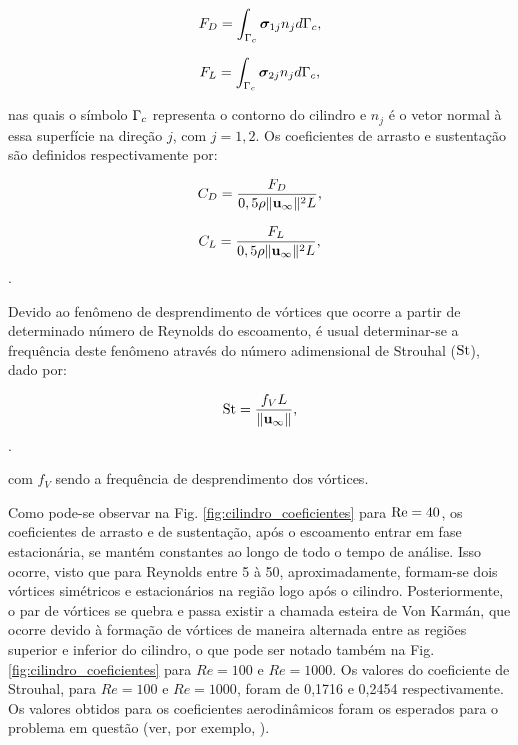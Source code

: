 \documentclass[tese_patricia]{subfiles}%
\begin{document}
\begin{align}
F_D = \int_{\Gamma_{c}} \boldsymbol{\sigma}_{1j}n_{j} d\Gamma_{c},
\end{align}

\begin{align}
F_L = \int_{\Gamma_{c}} \boldsymbol{\sigma}_{2j}n_{j} d\Gamma_{c},
\end{align}

\noindent nas quais o símbolo $\Gamma_{c}$ representa o contorno do cilindro e $n_j$ é o vetor normal à essa superfície na direção $j$, com $j=1,2$. Os coeficientes de arrasto e sustentação são definidos respectivamente por:

\begin{align}
	C_D = \frac{F_D}{0,5\rho \lVert \mathbf{u}_{\infty} \lVert^{2} L},
\end{align}

\begin{align}
	C_L = \frac{F_L}{0,5\rho \lVert \mathbf{u}_{\infty} \lVert^{2} L},
\end{align}.

Devido ao fenômeno de desprendimento de vórtices que ocorre a partir de determinado número de Reynolds do escoamento, é usual determinar-se a frequência deste fenômeno através do número adimensional de Strouhal ($\mathrm{St}$), dado por:

\begin{align}
	\mathrm{St} = \frac{f_{V}L}{\lVert \mathbf{u}_{\infty} \lVert},
\end{align}.

\noindent com $f_{V}$ sendo a frequência de desprendimento dos vórtices.

Como pode-se observar na Fig. \ref{fig:cilindro_coeficientes} para $\mathrm{Re} = 40$, os coeficientes de arrasto e de sustentação, após o escoamento entrar em fase estacionária, se mantém constantes ao longo de todo o tempo de análise. Isso ocorre, visto que para Reynolds entre 5 à 50, aproximadamente, formam-se dois vórtices simétricos e estacionários na região logo após o cilindro. Posteriormente, o par de vórtices se quebra e passa existir a chamada esteira de Von Karmán, que ocorre devido à formação de vórtices de maneira alternada entre as regiões superior e inferior do cilindro, o que pode ser notado também na Fig. \ref{fig:cilindro_coeficientes}  para $Re = 100$ e $Re=1000$. Os valores do coeficiente de Strouhal, para $Re = 100$ e $Re=1000$, foram de 0,1716 e 0,2454 respectivamente. Os valores obtidos para os coeficientes aerodinâmicos foram os esperados para o problema em questão (ver, por exemplo, ).
\end{document}
